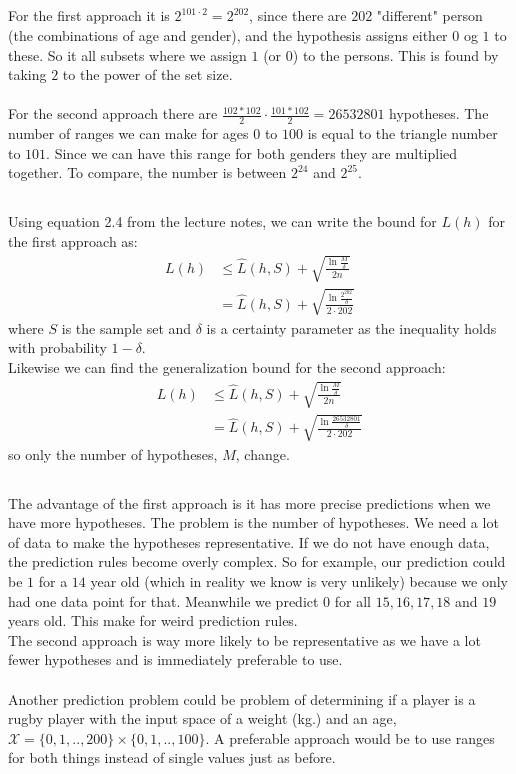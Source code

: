 \documentclass[a4paper]{article}
\begin{document}
\subsection{}
For the first approach it is $2^{101\cdot 2}=2^{202}$, since there are $202$ "different" person (the combinations of age and gender), and the hypothesis assigns either $0$ og $1$ to these. So it all subsets where we assign $1$ (or $0$) to the persons. This is found by taking $2$ to the power of the set size. \\
\\
For the second approach there are $\frac{102*102}{2}\cdot \frac{101*102}{2}=26532801$ hypotheses. The number of ranges we can make for ages $0$ to $100$ is equal to the triangle number to $101$. Since we can have this range for both genders they are multiplied together. To compare, the number is between $2^{24}$ and $2^{25}$.

\subsection{}
Using equation 2.4 from the lecture notes, we can write the bound for $L(h)$ for the first approach as:
\begin{align*}
L(h)&\leq \hat{L}(h,S)+\sqrt{\frac{\ln\frac{M}{\delta}}{2n}} \\
&=\hat{L}(h,S)+\sqrt{\frac{\ln\frac{2^{202}}{\delta}}{2\cdot 202}}
\end{align*}
where $S$ is the sample set and $\delta$ is a certainty parameter as the inequality holds with probability $1-\delta$. \\
Likewise we can find the generalization bound for the second approach:
\begin{align*}
L(h)&\leq \hat{L}(h,S)+\sqrt{\frac{\ln\frac{M}{\delta}}{2n}} \\
&=\hat{L}(h,S)+\sqrt{\frac{\ln\frac{26532801}{\delta}}{2\cdot 202}}
\end{align*}
so only the number of hypotheses, $M$, change.

\subsection{}
The advantage of the first approach is it has more precise predictions when we have more hypotheses. The problem is the number of hypotheses. We need a lot of data to make the hypotheses representative. If we do not have enough data, the prediction rules become overly complex. So for example, our prediction could be $1$ for a $14$ year old (which in reality we know is very unlikely) because we only had one data point for that. Meanwhile we predict $0$ for all $15,16,17,18$ and $19$ years old. This make for weird prediction rules. \\
The second approach is way more likely to be representative as we have a lot fewer hypotheses and is immediately preferable to use. \\
\\
Another prediction problem could be problem of determining if a player is a rugby player with the input space of a weight (kg.) and an age, $\mathcal{X}=\{0,1,..,200\}\times \{0,1,..,100\}$. A preferable approach would be to use ranges for both things instead of single values just as before.
\end{document}
